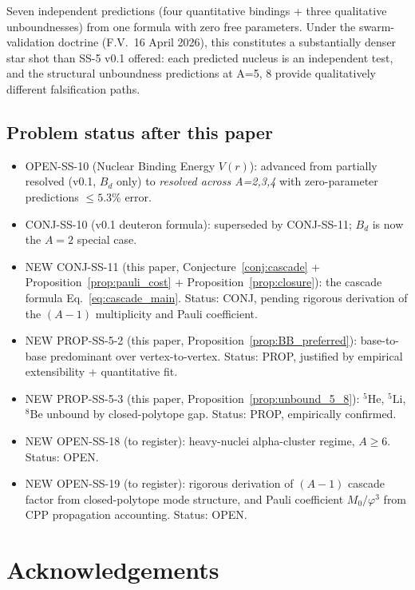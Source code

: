 \documentclass[11pt,letterpaper]{article}
\newcommand{\phig}{\varphi}
\newcommand{\Mzero}{M_0}
\newcommand{\Bd}{B_{d}}
\begin{document}
Seven independent predictions (four quantitative bindings + three qualitative unboundnesses) from one formula with zero free parameters. Under the swarm-validation doctrine (F.V.\ 16 April 2026), this constitutes a substantially denser star shot than SS-5 v0.1 offered: each predicted nucleus is an independent test, and the structural unboundness predictions at A=5, 8 provide qualitatively different falsification paths.

\subsection{Problem status after this paper}

\begin{itemize}
\item OPEN-SS-10 (Nuclear Binding Energy $V(r)$): advanced from partially resolved (v0.1, $\Bd$ only) to \emph{resolved across A=2,3,4} with zero-parameter predictions $\leq 5.3\%$ error.
\item CONJ-SS-10 (v0.1 deuteron formula): superseded by CONJ-SS-11; $\Bd$ is now the $A=2$ special case.
\item NEW CONJ-SS-11 (this paper, Conjecture~\ref{conj:cascade} + Proposition~\ref{prop:pauli_cost} + Proposition~\ref{prop:closure}): the cascade formula Eq.~\eqref{eq:cascade_main}. Status: CONJ, pending rigorous derivation of the $(A-1)$ multiplicity and Pauli coefficient.
\item NEW PROP-SS-5-2 (this paper, Proposition~\ref{prop:BB_preferred}): base-to-base predominant over vertex-to-vertex. Status: PROP, justified by empirical extensibility + quantitative fit.
\item NEW PROP-SS-5-3 (this paper, Proposition~\ref{prop:unbound_5_8}): ${}^{5}\mathrm{He}$, ${}^{5}\mathrm{Li}$, ${}^{8}\mathrm{Be}$ unbound by closed-polytope gap. Status: PROP, empirically confirmed.
\item NEW OPEN-SS-18 (to register): heavy-nuclei alpha-cluster regime, $A \geq 6$. Status: OPEN.
\item NEW OPEN-SS-19 (to register): rigorous derivation of $(A-1)$ cascade factor from closed-polytope mode structure, and Pauli coefficient $\Mzero/\phig^3$ from CPP propagation accounting. Status: OPEN.
\end{itemize}

\section*{Acknowledgements}
\end{document}
